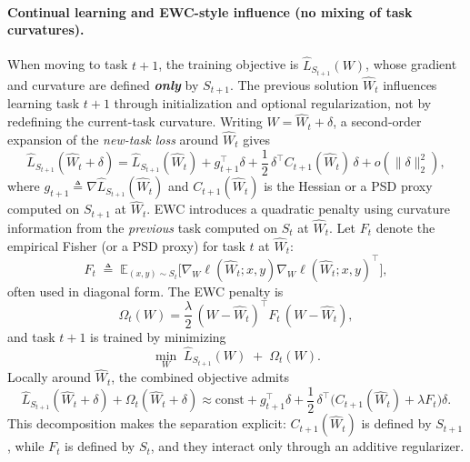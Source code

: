 \documentclass{article}
\theoremstyle{plain}
\theoremstyle{definition}
\theoremstyle{remark}
\begin{document}
\paragraph{Continual learning and EWC-style influence (no mixing of task curvatures).}
    When moving to task $t+1$, the training objective is $\hat L_{S_{t+1}}(W)$, whose gradient and curvature are defined \textbf{\emph{only}} by $S_{t+1}$. The previous solution $\hat W_t$ influences learning task $t+1$ through initialization and optional regularization, not by redefining the current-task curvature. Writing $W=\hat W_t+\delta$, a second-order expansion of the \emph{new-task loss} around $\hat W_t$ gives
$$
\hat L_{S_{t+1}}(\hat W_t+\delta)
=
\hat L_{S_{t+1}}(\hat W_t)
+
g_{t+1}^\top \delta
+
\frac12\,\delta^\top C_{t+1}(\hat W_t)\,\delta
+
o(\|\delta\|_2^2),
$$
where $g_{t+1}\triangleq \nabla \hat L_{S_{t+1}}(\hat W_t)$ and $C_{t+1}(\hat W_t)$ is the Hessian or a PSD proxy computed on $S_{t+1}$ at $\hat W_t$. EWC introduces a quadratic penalty using curvature information from the \emph{previous} task computed on $S_t$ at $\hat W_t$. Let $F_t$ denote the empirical Fisher (or a PSD proxy) for task $t$ at $\hat W_t$:
$$
F_t\;\triangleq\;\mathbb E_{(x,y)\sim S_t}\!\big[\nabla_W \ell(\hat W_t;x,y)\nabla_W \ell(\hat W_t;x,y)^\top\big],
$$
often used in diagonal form. The EWC penalty is
$$
\Omega_t(W)
=
\frac{\lambda}{2}\,(W-\hat W_t)^\top F_t\,(W-\hat W_t),
$$
and task $t+1$ is trained by minimizing
$$
\min_W\;\hat L_{S_{t+1}}(W)\;+\;\Omega_t(W).
$$
Locally around $\hat W_t$, the combined objective admits
$$
\hat L_{S_{t+1}}(\hat W_t+\delta)+\Omega_t(\hat W_t+\delta)
\approx
\text{const}
+
g_{t+1}^\top \delta
+
\frac12\,\delta^\top\Big(C_{t+1}(\hat W_t)+\lambda F_t\Big)\delta.
$$
This decomposition makes the separation explicit: $C_{t+1}(\hat W_t)$ is defined by $S_{t+1}$, while $F_t$ is defined by $S_t$, and they interact only through an additive regularizer.
\end{document}
